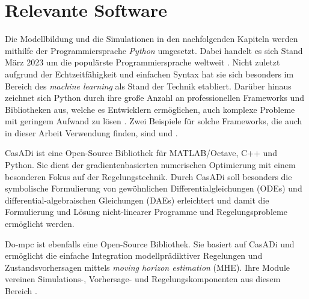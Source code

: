 \section{Relevante Software} \label{sec_HardSoftware}
Die Modellbildung und die Simulationen in den nachfolgenden Kapiteln werden mithilfe der Programmiersprache \textit{Python} umgesetzt.
Dabei handelt es sich Stand März 2023 um die populärste Programmiersprache weltweit \cite{Statista}.
Nicht zuletzt aufgrund der Echtzeitfähigkeit und einfachen Syntax \cite[S.9]{Python} hat sie sich besonders im Bereich des \textit{machine learning} als Stand der Technik etabliert.
Darüber hinaus zeichnet sich Python durch ihre große Anzahl an professionellen Frameworks und Bibliotheken aus, welche es Entwicklern ermöglichen, auch komplexe Probleme mit geringem Aufwand zu lösen \cite[S.3]{Python}.
Zwei Beispiele für solche Frameworks, die auch in dieser Arbeit Verwendung finden, sind  und .

CasADi ist eine Open-Source Bibliothek für MATLAB/Octave, C++ und Python.
Sie dient der gradientenbasierten numerischen Optimierung mit einem besonderen Fokus auf der Regelungstechnik.
Durch CasADi soll besonders die symbolische Formulierung von gewöhnlichen Differentialgleichungen (ODEs) und differential-algebraischen Gleichungen (DAEs) erleichtert und damit die Formulierung und Lösung nicht-linearer Programme und Regelungsprobleme ermöglicht werden. \cite{Casadi}

\enlargethispage{\baselineskip}
Do-mpc ist ebenfalls eine Open-Source Bibliothek.
Sie basiert auf CasADi und ermöglicht die einfache Integration modellprädiktiver Regelungen und Zustandsvorhersagen mittels \textit{moving horizon estimation} (MHE).
Ihre Module vereinen \mbox{Simulations-,} Vorhersage- und Regelungskomponenten aus diesem Bereich \cite{Dompc2}.
